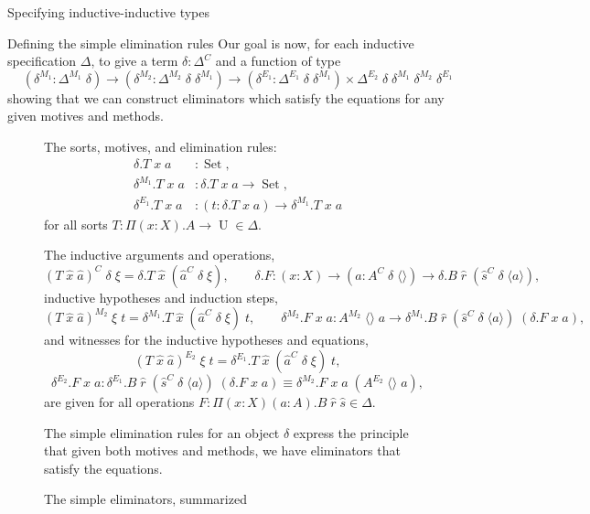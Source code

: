 \documentclass[acmsmall,review]{acmart}\settopmatter{printfolios=true,printccs=false,printacmref=false}
\DeclareMathOperator{\USet}{Set}
\DeclareMathOperator{\UU}{U}
\newcommand{\Id}[2]{{#1}\equiv{#2}}
\def\emptytuple{\langle\rangle}
\begin{document}
\begin{section}{Specifying inductive-inductive types}
\begin{subsection}{\label{simple-elim-section}Defining the simple elimination rules}
Our goal is now, for each inductive specification $\Delta$, to give a term $\delta : \Delta^C$ and a function of type \[(\delta^{M_1} : \Delta^{M_1}\;\delta) \to (\delta^{M_2} : \Delta^{M_2}\;\delta\;\delta^{M_1}) \to (\delta^{E_1} : \Delta^{E_1}\;\delta\;\delta^{M_1}) \times \Delta^{E_2}\;\delta\;\delta^{M_1}\;\delta^{M_2}\;\delta^{E_1}\] showing that we can construct eliminators which satisfy the equations for any given motives and methods.

\begin{figure}[htpb]
    \begin{flushleft}
        The sorts, motives, and elimination rules:
        \begin{align*}
        \delta.T\;x\;a &: \USet,\\
        \delta^{M_1}.T\;x\;a &: \delta.T\;x\;a \to \USet,\\
        \delta^{E_1}.T\;x\;a &: (t : \delta.T\;x\;a) \to \delta^{M_1}.T\;x\;a
        \end{align*}
        for all sorts $T : \Pi(x : X).A\to\UU \in\Delta$.
        
        The inductive arguments and operations,
        \[(T\;\hat{x}\;\hat{a})^C\;\delta\;\xi = \delta.T\;\hat{x}\;(\hat{a}^C\;\delta\;\xi),
        \qquad\delta.F : (x : X) \to (a : A^C\;\delta\;\emptytuple) \to \delta.B\;\hat{r}\;(\hat{s}^C\;\delta\;\langle a\rangle),\]
        inductive hypotheses and induction steps,
        \[(T\;\hat{x}\;\hat{a})^{M_2}\;\xi\;t = \delta^{M_1}.T\;\hat{x}\;(\hat{a}^C\;\delta\;\xi)\;t,
        \qquad\delta^{M_2}.F\;x\;a : A^{M_2}\;\emptytuple\;a \to \delta^{M_1}.B\;\hat{r}\;(\hat{s}^C\;\delta\;\langle a \rangle)\;(\delta.F\;x\;a),\]
        and witnesses for the inductive hypotheses and equations,
        \[(T\;\hat{x}\;\hat{a})^{E_2}\;\xi\;t = \delta^{E_1}.T\;\hat{x}\;(\hat{a}^C\;\delta\;\xi)\;t,\]
        \[\delta^{E_2}.F\;x\;a : \Id{\delta^{E_1}.B\;\hat{r}\;(\hat{s}^C\;\delta\;\langle a \rangle)\;(\delta.F\;x\;a)}{\delta^{M_2}.F\;x\;a\;(A^{E_2}\;\emptytuple\;a)},\]
        are given for all operations $F : \Pi(x : X)(a : A).B\;\hat{r}\;\hat{s} \in \Delta$.
        
        The simple elimination rules for an object $\delta$ express the principle that given both motives and methods, we have eliminators that satisfy the equations.
    \end{flushleft}
    
    \caption{\label{simple-elim-translation}The simple eliminators, summarized}
\end{figure}

\end{subsection}

\end{section}
\end{document}
